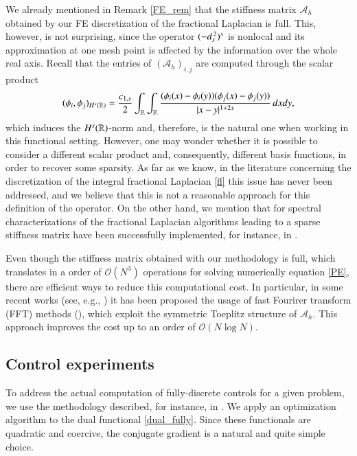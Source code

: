 \begin{remark}
We already mentioned in Remark \ref{FE_rem} that the stiffness matrix $\mathcal A_h$ obtained by our FE discretization of the fractional Laplacian is full. This, however, is not surprising, since the operator $(-d_x^{\,2})^{s}$ is nonlocal and its approximation at one mesh point is affected by the information over the whole real axis. Recall that the entries of $\left(\mathcal A_h\right)_{i,j}$ are computed through the scalar product 
\begin{align*}
	(\phi_i,\phi_j)_{H^s(\mathbb{R})} = \frac{c_{1,s}}{2} \int_{\mathbb{R}}\int_{\mathbb{R}}\frac{(\phi_i(x)-\phi_i(y))(\phi_j(x)-\phi_j(y))}{|x-y|^{1+2s}}\,dxdy,	
\end{align*}
which induces the $H^s(\mathbb{R})$-norm and, therefore, is the natural one when working in this functional setting. However, one may wonder whether it is possible to consider a different scalar product and, consequently, different basis functions, in order to recover some sparsity. As far as we know, in the literature concerning the discretization of the integral fractional Laplacian \eqref{fl} this issue has never been addressed, and we believe that this is not a reasonable approach for this definition of the operator. On the other hand, we mention that for spectral characterizations of the fractional Laplacian algorithms leading to a sparse stiffness matrix have been successfully implemented, for instance, in \cite{meidner2017hp}.

Even though the stiffness matrix obtained with our methodology is full, which translates in a order of $\mathcal O(N^3)$ operations for solving numerically equation \eqref{PE}, there are efficient ways to reduce this computational cost. In particular, in some recent works (see, e.g., \cite{duo2018novel}) it has been proposed the usage of fast Fourirer transform (FFT) methods (\cite{chandrasekaran2007superfast,stewart2003superfast}), which exploit the symmetric Toeplitz structure of $\mathcal A_h$. This approach improves the cost up to an order of $\mathcal O(N\log N)$.
\end{remark}

\subsection{Control experiments}\label{control_exp}

To address the actual computation of fully-discrete controls for a given problem, we use the methodology described, for instance, in \cite{glowinski2008exact}. We apply an optimization algorithm to the dual functional \eqref{dual_fully}. Since these functionals are quadratic and coercive, the conjugate gradient is a natural and quite simple choice.

